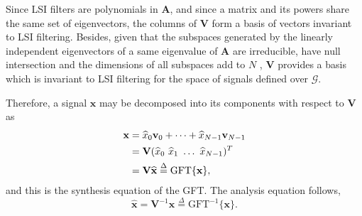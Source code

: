 Since LSI filters are polynomials in $ \mathbf{A} $, and since a matrix and its powers share the same set of eigenvectors, the columns of $ \mathbf{V} $ form a basis of vectors invariant to LSI filtering. Besides, given that the subspaces generated by the linearly independent eigenvectors of a same eigenvalue of $ \mathbf{A} $ are irreducible, have null intersection and the dimensions of all subspaces add to $ N $ \cite{sandryhaila2013gft}, $ \mathbf{V} $ provides a basis which is invariant to LSI filtering for the space of signals defined over $ \mathcal{G} $.

Therefore, a signal $ \mathbf{x} $ may be decomposed into its components with respect to $ \mathbf{V} $ as
\begin{align}\label{eq:GFT_inv}
\mathbf{x} &= \widehat{x}_0 \mathbf{v}_0 + \dots + \widehat{x}_{N-1} \mathbf{v}_{N-1} \notag \\
&= \mathbf{V} (\widehat{x}_0 \ \widehat{x}_1 \ \dots \ \widehat{x}_{N-1})^T \notag \\
&= \mathbf{V} \widehat{\mathbf{x}} \overset{\Delta}{=} \textrm{GFT}\{\mathbf{x}\},
\end{align}
and this is the synthesis equation of the GFT. The analysis equation follows,
\begin{equation}\label{eq:GFT_fwd}
\widehat{\mathbf{x}} = \mathbf{V}^{-1} \mathbf{x} \overset{\Delta}{=} \textrm{GFT}^{-1}\{\mathbf{x}\}.
\end{equation}

